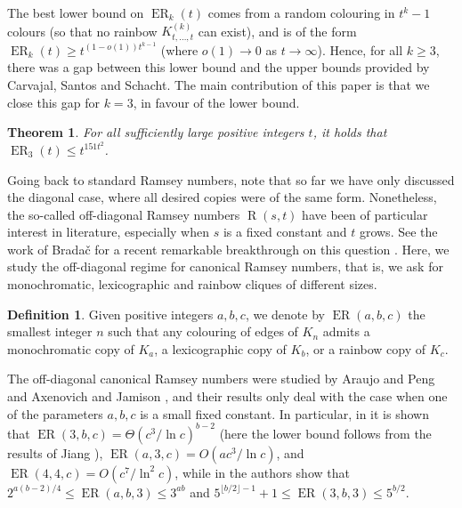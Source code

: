 \documentclass[10pt,a4paper]{article}
\theoremstyle{plain}
\newtheorem{theorem}{Theorem}[section]
\theoremstyle{definition}
\newtheorem{definition}{Definition}
\newcommand{\erado}[2]{\operatorname{ER}_{#1}(#2)}
\newcommand{\offerado}[3]{\operatorname{ER}(#1,#2,#3)}
\newcommand{\cmpltt}[3]{K^{(#1)}_{#2,\dots,#3}}
\newcommand{\cmplt}[2]{\cmpltt{#1}{#2}{#2}}
\begin{document}
The best lower bound on $\erado{k}{t}$ comes from a random colouring in $t^k-1$ colours (so that no rainbow $\cmplt{k}{t}$ can exist), and is of the form $\erado{k}{t}\ge t^{(1-o(1))t^{k-1}}$ (where $o(1)\to 0$ as $t\to \infty$). Hence, for all $k\geq 3$, there was a gap between this lower bound and the upper bounds provided by Carvajal, Santos and Schacht. The main contribution of this paper is that we close this gap for $k=3$, in favour of the lower bound.

\begin{theorem}\label{thm-tri-erado}
    For all sufficiently large positive integers $t$, it holds that $\erado{3}{t}\le t^{151t^2}$.
\end{theorem}

\bigskip

Going back to standard Ramsey numbers, note that so far we have only discussed the diagonal case, where all desired copies were of the same form. Nonetheless, the so-called off-diagonal Ramsey numbers $\operatorname{R}(s,t)$ have been of particular interest in literature, especially when $s$ is a fixed constant and $t$ grows. See the work of Brada\v{c} for a recent remarkable breakthrough on this question \cite{bradac2026off}. Here, we study the off-diagonal regime for canonical Ramsey numbers, that is, we ask for monochromatic, lexicographic and rainbow cliques of different sizes.

\begin{definition}\label{def-offerado}
    Given positive integers $a,b,c$, we denote by $\offerado{a}{b}{c}$ the smallest integer $n$ such that any colouring of edges of $K_n$ admits a monochromatic copy of $K_a$, a lexicographic copy of $K_b$, or a rainbow copy of $K_c$.
\end{definition}

The off-diagonal canonical Ramsey numbers were studied by Araujo and Peng \cite{araujo2024off} and Axenovich and Jamison \cite{axenovich2005canonical}, and their results only deal with the case when one of the parameters $a,b,c$ is a small fixed constant. In particular, in \cite{araujo2024off} it is shown that $\offerado{3}{b}{c}=\Theta(c^3/\ln c)^{b-2}$ (here the lower bound follows from the results of Jiang \cite{jiang2009canonical}), $\offerado{a}{3}{c}= O(ac^3/\ln c)$, and $\offerado{4}{4}{c}= O(c^7/\ln^2 c)$, while in \cite{axenovich2005canonical} the authors show that $2^{a(b-2)/4}\le \offerado{a}{b}{3}\le 3^{ab}$ and $5^{\lfloor b/2\rfloor-1}+1\le \offerado{3}{b}{3}\le 5^{b/2}$.
\end{document}
